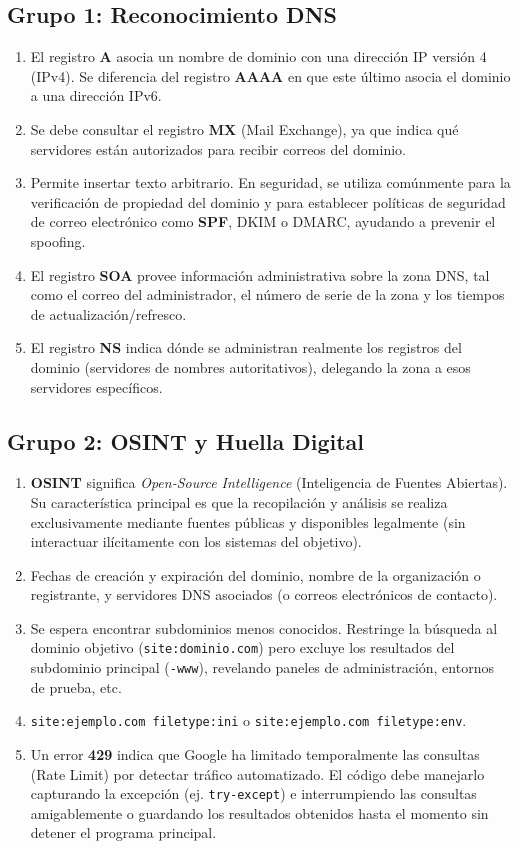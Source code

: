 \documentclass[12pt,a4paper]{article}
\begin{document}
\subsection{Grupo 1: Reconocimiento DNS}
\begin{enumerate}[label=\textbf{\arabic*.}]
    \item El registro \textbf{A} asocia un nombre de dominio con una dirección IP versión 4 (IPv4). Se diferencia del registro \textbf{AAAA} en que este último asocia el dominio a una dirección IPv6.
    \item Se debe consultar el registro \textbf{MX} (Mail Exchange), ya que indica qué servidores están autorizados para recibir correos del dominio.
    \item Permite insertar texto arbitrario. En seguridad, se utiliza comúnmente para la verificación de propiedad del dominio y para establecer políticas de seguridad de correo electrónico como \textbf{SPF}, DKIM o DMARC, ayudando a prevenir el spoofing.
    \item El registro \textbf{SOA} provee información administrativa sobre la zona DNS, tal como el correo del administrador, el número de serie de la zona y los tiempos de actualización/refresco.
    \item El registro \textbf{NS} indica dónde se administran realmente los registros del dominio (servidores de nombres autoritativos), delegando la zona a esos servidores específicos.
\end{enumerate}

\subsection{Grupo 2: OSINT y Huella Digital}
\begin{enumerate}[label=\textbf{\arabic*.}]
    \item \textbf{OSINT} significa \textit{Open-Source Intelligence} (Inteligencia de Fuentes Abiertas). Su característica principal es que la recopilación y análisis se realiza exclusivamente mediante fuentes públicas y disponibles legalmente (sin interactuar ilícitamente con los sistemas del objetivo).
    \item Fechas de creación y expiración del dominio, nombre de la organización o registrante, y servidores DNS asociados (o correos electrónicos de contacto).
    \item Se espera encontrar subdominios menos conocidos. Restringe la búsqueda al dominio objetivo (\texttt{site:dominio.com}) pero excluye los resultados del subdominio principal (\texttt{-www}), revelando paneles de administración, entornos de prueba, etc.
    \item \texttt{site:ejemplo.com filetype:ini} o \texttt{site:ejemplo.com filetype:env}.
    \item Un error \textbf{429} indica que Google ha limitado temporalmente las consultas (Rate Limit) por detectar tráfico automatizado. El código debe manejarlo capturando la excepción (ej. \texttt{try-except}) e interrumpiendo las consultas amigablemente o guardando los resultados obtenidos hasta el momento sin detener el programa principal.
\end{enumerate}
\end{document}
